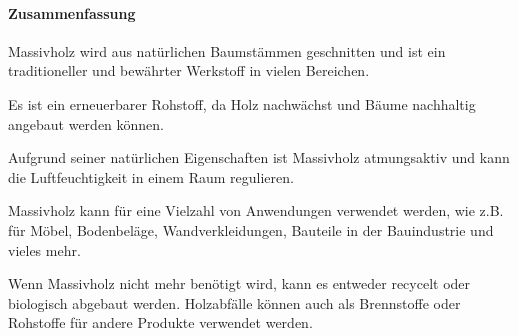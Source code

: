 \documentclass{article}
\begin{document}
\begin{multicols}{3}
\paragraph{Zusammenfassung}
\begin{compactitem}
  \item Massivholz wird aus natürlichen Baumstämmen geschnitten und ist ein
    traditioneller und bewährter Werkstoff in vielen Bereichen.
  \item Es ist ein erneuerbarer Rohstoff, da Holz nachwächst und Bäume
    nachhaltig angebaut werden können.
  \item Aufgrund seiner natürlichen Eigenschaften ist Massivholz atmungsaktiv
    und kann die Luftfeuchtigkeit in einem Raum regulieren.
  \item Massivholz kann für eine Vielzahl von Anwendungen verwendet werden, wie
    z.B. für Möbel, Bodenbeläge, Wandverkleidungen, Bauteile in der
    Bauindustrie und vieles mehr.
  \item Wenn Massivholz nicht mehr benötigt wird, kann es entweder recycelt
    oder biologisch abgebaut werden. Holzabfälle können auch als Brennstoffe
    oder Rohstoffe für andere Produkte verwendet werden.
\end{compactitem}



\end{multicols}

\clearpage

\newpage
\pagestyle{fancy}
\fancyhf{}
\end{document}
